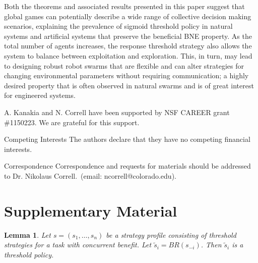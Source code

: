 \documentclass{nature}
\newtheorem{lemma}{Lemma}
\begin{document}
Both the theorems and associated results presented in this paper suggest that global games can potentially describe a wide range of collective decision making scenarios, explaining the prevalence of sigmoid threshold policy in natural systems and artificial systems that preserve the beneficial BNE property. As the total number of agents increases, the response threshold strategy also allows the system to balance between exploitation and exploration. This, in turn, may lead to designing robust robot swarms that are flexible and can alter strategies for changing environmental parameters without requiring communication; a highly desired property that is often observed in natural swarms and is of great interest for engineered systems.

\nolinenumbers


\begin{addendum}
 \item A. Kanakia and N. Correll have been supported by NSF CAREER grant \#1150223. We are grateful for this support. 
 \item[Competing Interests] The authors declare that they have no
competing financial interests.
 \item[Correspondence] Correspondence and requests for materials
should be addressed to Dr. Nikolaus Correll.~(email: ncorrell@colorado.edu).
\end{addendum}


\newpage
\section*{Supplementary Material}

\setcounter{lemma}{0}
\begin{lemma}
Let $s=(s_1,\ldots,s_n)$ be a strategy profile consisting of threshold strategies for a task with  concurrent benefit. Let $\tilde{s}_i=BR(s_{-i})$. Then $\tilde{s}_i$ is a threshold policy. 
\end{lemma} 
\end{document}
